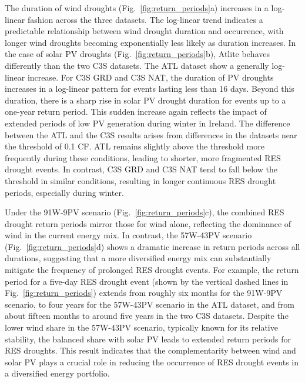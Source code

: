 \documentclass[preprint, 12pt]{elsarticle}
\begin{document}
The duration of wind droughts (Fig.~\ref{fig:return_periods}a) increases in a log-linear fashion across the three datasets. The log-linear trend indicates a predictable relationship between wind drought duration and occurrence, with longer wind droughts becoming exponentially less likely as duration increases. In the case of solar PV droughts (Fig.~\ref{fig:return_periods}b), Atlite behaves differently than the two C3S datasets. The ATL dataset show a generally log-linear increase. For C3S GRD and C3S NAT, the duration of PV droughts increases in a log-linear pattern for events lasting less than 16 days. Beyond this duration, there is a sharp rise in solar PV drought duration for events up to a one-year return period. This sudden increase again reflects the impact of extended periods of low PV generation during winter in Ireland. The difference between the ATL and the C3S results arises from differences in the datasets near the threshold of 0.1 CF. ATL remains slightly above the threshold more frequently during these conditions, leading to shorter, more fragmented RES drought events. In contrast, C3S GRD and C3S NAT tend to fall below the threshold in similar conditions, resulting in longer continuous RES drought periods, especially during winter.

Under the 91W-9PV scenario (Fig.~\ref{fig:return_periods}c), the combined RES drought return periods mirror those for wind alone, reflecting the dominance of wind in the current energy mix. In contrast, the 57W-43PV scenario (Fig.~\ref{fig:return_periods}d) shows a dramatic increase in return periods across all durations, suggesting that a more diversified energy mix can substantially mitigate the frequency of prolonged RES drought events. For example, the return period for a five-day RES drought event (shown by the vertical dashed lines in Fig.~\ref{fig:return_periods}) extends from roughly six months for the 91W-9PV scenario, to four years for the 57W-43PV scenario in the ATL dataset, and from about fifteen months to around five years in the two C3S datasets. Despite the lower wind share in the 57W-43PV scenario, typically known for its relative stability, the balanced share with solar PV leads to extended return periods for RES droughts. This result indicates that the complementarity between wind and solar PV plays a crucial role in reducing the occurrence of RES drought events in a diversified energy portfolio.
\end{document}
